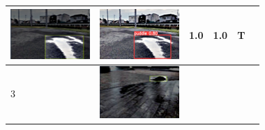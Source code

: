 \documentclass[10pt]{jarticle}
\begin{document}
\begin{table}[H]
\begin{tabular}{|l|l|l|l|l|l|}
\begin{minipage}{.1\textwidth}
            \includegraphics[width=0.9\linewidth]{./fig/2tab2_a.png}
           \end{minipage}       & \begin{minipage}{.1\textwidth}
            \centering
            \includegraphics[width=0.9\linewidth]{./fig/2tab2_r.png}
           \end{minipage}       & 1.0 & 1.0 & T       \\ \hline
        3  & \begin{minipage}{.1\textwidth}
            \centering
            \includegraphics[width=0.9\linewidth]{./fig/2tab3_a.png}

\end{minipage}
\end{tabular}
\end{table}
\end{document}
